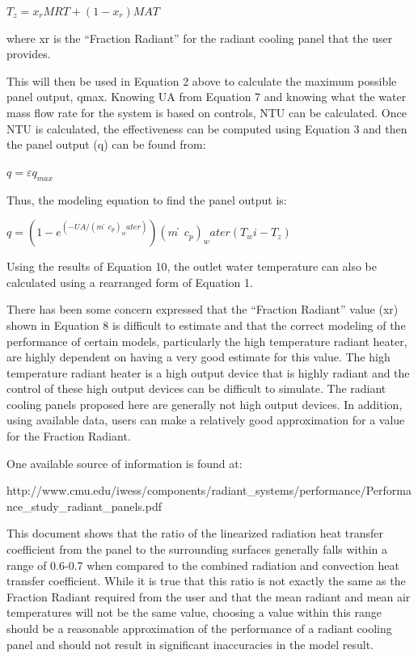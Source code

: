 $T_z = x_r MRT+ ( 1-x_r ) MAT$

where xr is the “Fraction Radiant” for the radiant cooling panel that the user provides.

This will then be used in Equation 2 above to calculate the maximum possible panel output, qmax.  Knowing UA from Equation 7 and knowing what the water mass flow rate for the system is based on controls, NTU can be calculated.  Once NTU is calculated, the effectiveness can be computed using Equation 3 and then the panel output (q) can be found from:

$q=ε q_{max}$

Thus, the modeling equation to find the panel output is:

$q=(1-e^(-UA/(m ̇c_p )_water ) ) (m ̇c_p )_water (T_wi-T_z )$

Using the results of Equation 10, the outlet water temperature can also be calculated using a rearranged form of Equation 1.

There has been some concern expressed that the “Fraction Radiant” value (xr) shown in Equation 8 is difficult to estimate and that the correct modeling of the performance of certain models, particularly the high temperature radiant heater, are highly dependent on having a very good estimate for this value.  The high temperature radiant heater is a high output device that is highly radiant and the control of these high output devices can be difficult to simulate.  The radiant cooling panels proposed here are generally not high output devices.  In addition, using available data, users can make a relatively good approximation for a value for the Fraction Radiant.

One available source of information is found at:

http://www.cmu.edu/iwess/components/radiant\_systems/performance/Performance\_study\_radiant\_panels.pdf

This document shows that the ratio of the linearized radiation heat transfer coefficient from the panel to the surrounding surfaces generally falls within a range of 0.6-0.7 when compared to the combined radiation and convection heat transfer coefficient.  While it is true that this ratio is not exactly the same as the Fraction Radiant required from the user and that the mean radiant and mean air temperatures will not be the same value, choosing a value within this range should be a reasonable approximation of the performance of a radiant cooling panel and should not result in significant inaccuracies in the model result.

